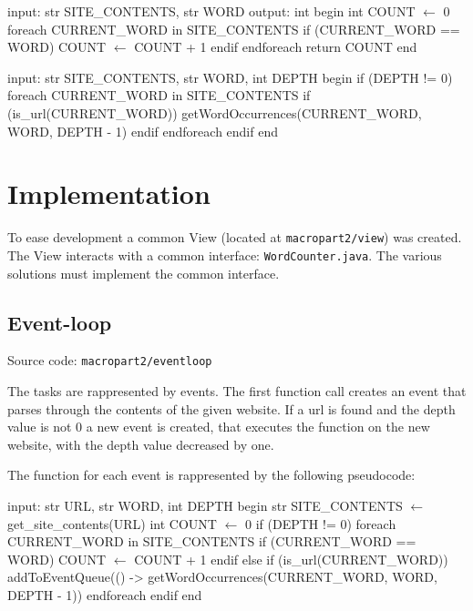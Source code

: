 \documentclass[12pt, a4paper]{report}
\begin{document}
\newpage

\begin{algorithm}[caption={countTask expressed in pseudocode}, label={alg1}]
input: str SITE_CONTENTS, str WORD
output: int
begin
    int COUNT $\gets$ 0
    foreach CURRENT_WORD in SITE_CONTENTS
        if (CURRENT_WORD == WORD)
            COUNT $\gets$ COUNT + 1
        endif
    endforeach
    return COUNT
end       
\end{algorithm}

\begin{algorithm}[caption={linkTask expressed in pseudocode}, label={alg2}]
input: str SITE_CONTENTS, str WORD, int DEPTH
begin
    if (DEPTH != 0)
        foreach CURRENT_WORD in SITE_CONTENTS
            if (is_url(CURRENT_WORD))
                getWordOccurrences(CURRENT_WORD, WORD, DEPTH - 1)
            endif
        endforeach
    endif
end       
\end{algorithm}

\section{Implementation}
To ease development a common View (located at \texttt{macropart2/view}) was created. The View interacts with a common interface: \texttt{WordCounter.java}.
 The various solutions must implement the common interface.

\subsection{Event-loop}
Source code: \texttt{macropart2/eventloop}

The tasks are rappresented by events. The first function call creates an event that parses through the contents of the given website.
 If a url is found and the depth value is not 0 a new event is created, that executes the function on the new website, with the depth value decreased by one.

 The function for each event is rappresented by the following pseudocode:

\newpage

\begin{algorithm}[label={alg3}]
input: str URL, str WORD, int DEPTH
begin
    str SITE_CONTENTS $\gets$ get_site_contents(URL)
    int COUNT $\gets$ 0
    if (DEPTH != 0)
        foreach CURRENT_WORD in SITE_CONTENTS
            if (CURRENT_WORD == WORD)
                COUNT $\gets$ COUNT + 1
            endif
            else if (is_url(CURRENT_WORD))
                addToEventQueue(() -> 
                    getWordOccurrences(CURRENT_WORD, WORD, DEPTH - 1))
        endforeach
    endif
end       
\end{algorithm}
\end{document}
